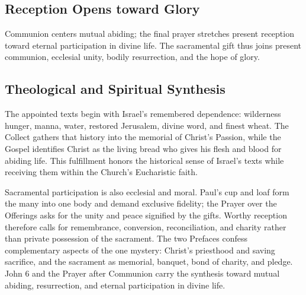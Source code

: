 \begin{deepstudy}
\subsection*{Reception Opens toward Glory\enspace{}}

Communion centers mutual abiding; the final prayer stretches present reception toward eternal participation in divine life. The sacramental gift thus joins present communion, ecclesial unity, bodily resurrection, and the hope of glory.

\clearpage
\subsection*{Theological and Spiritual Synthesis}

The appointed texts begin with Israel's remembered dependence: wilderness hunger, manna, water, restored Jerusalem, divine word, and finest wheat. The Collect gathers that history into the memorial of Christ's Passion, while the Gospel identifies Christ as the living bread who gives his flesh and blood for abiding life. This fulfillment honors the historical sense of Israel's texts while receiving them within the Church's Eucharistic faith.

Sacramental participation is also ecclesial and moral. Paul's cup and loaf form the many into one body and demand exclusive fidelity; the Prayer over the Offerings asks for the unity and peace signified by the gifts. Worthy reception therefore calls for remembrance, conversion, reconciliation, and charity rather than private possession of the sacrament.
The two Prefaces confess complementary aspects of the one mystery: Christ's priesthood and saving sacrifice, and the sacrament as memorial, banquet, bond of charity, and pledge. John 6 and the Prayer after Communion carry the synthesis toward mutual abiding, resurrection, and eternal participation in divine life.


\end{deepstudy}
